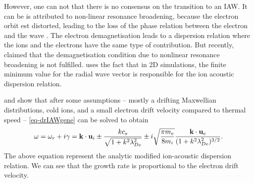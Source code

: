     
    However, one can not that there is no consensus on the transition to an \ac{IAW}.
    It can be is attributed to non-linear resonance broadening, because the electron orbit est distorted, leading to the loss of the phase relation between the electron and the wave \citep{taccogna2019}.
    The electron demagnetisation leads to a dispersion relation where the ions and the electrons have the same type of contribution.
    But recently, \citet{janhunen2018a} claimed that the demagnetisation condition due to nonlinear resonance broadening is not fulfilled.
    \citet{lafleur2017a} uses the fact that in \ac{2D} simulations, the finite minimum value for the radial wave vector is responsible for the ion acoustic dispersion relation.
    
    \citet{lafleur2016} and \citet{janhunen2018} show that after some assumptions -- mostly a drifting Maxwellian distributions, cold ions, and a small electron drift velocity compared to thermal speed -- \cref{eq-drIAWgene} can be solved to obtain
    \begin{equation} \label{eq-MIAW}
      \omega = \omega_r + i \gamma = {\mathbf k} \cdot {\mathbf u_{i}} \pm \frac{k c_s}{\sqrt{1 + k^2 \lambda_{De}^2}} \pm i \sqrt{\frac{\pi m_e}{8 m_i}} \frac{{\mathbf k} \cdot {\mathbf u_{e}}}{( 1 + k^2 \lambda_{De}^2)^{3/2}}.
    \end{equation}
    The above equation represent the analytic modified ion-acoustic dispersion relation.
    We can see that the growth rate is proportional to the electron drift velocity.
    